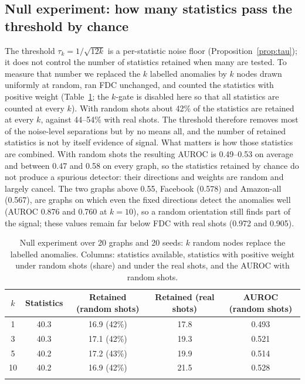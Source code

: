 \documentclass[pdflatex,sn-mathphys-ay]{sn-jnl}
\theoremstyle{plain}
\theoremstyle{remark}
\begin{document}
\subsection{Null experiment: how many statistics pass the threshold by chance}\label{sec:null}

The threshold $\tau_k=1/\sqrt{12k}$ is a per-statistic noise floor (Proposition~\ref{prop:tau}); it does not control the number of statistics retained when many are tested. To measure that number we replaced the $k$ labelled anomalies by $k$ nodes drawn uniformly at random, ran FDC unchanged, and counted the statistics with positive weight (Table~\ref{tab:null}; the $k$-gate is disabled here so that all statistics are counted at every $k$). With random shots about 42\% of the statistics are retained at every $k$, against 44--54\% with real shots. The threshold therefore removes most of the noise-level separations but by no means all, and the number of retained statistics is not by itself evidence of signal. What matters is how those statistics are combined. With random shots the resulting AUROC is 0.49--0.53 on average and between 0.47 and 0.58 on every graph, so the statistics retained by chance do not produce a spurious detector: their directions and weights are random and largely cancel. The two graphs above 0.55, Facebook (0.578) and Amazon-all (0.567), are graphs on which even the fixed directions detect the anomalies well (AUROC 0.876 and 0.760 at $k=10$), so a random orientation still finds part of the signal; these values remain far below FDC with real shots (0.972 and 0.905).

\begin{table}[!ht]
\caption{Null experiment over 20 graphs and 20 seeds: $k$ random nodes replace the labelled anomalies. Columns: statistics available, statistics with positive weight under random shots (share) and under the real shots, and the AUROC with random shots.}
\label{tab:null}
\footnotesize
\begin{tabular*}{\textwidth}{@{\extracolsep{\fill}}ccccc@{}}
\toprule
$k$ & Statistics & Retained (random shots) & Retained (real shots) & AUROC (random shots) \\
\midrule
1 & 40.3 & 16.9 (42\%) & 17.8 & 0.493 \\
3 & 40.3 & 17.1 (42\%) & 19.3 & 0.521 \\
5 & 40.2 & 17.2 (43\%) & 19.9 & 0.514 \\
10 & 40.2 & 16.9 (42\%) & 21.5 & 0.528 \\
\botrule
\end{tabular*}
\end{table}
\end{document}
